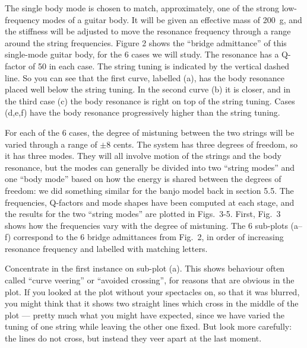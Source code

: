   The single body mode is chosen to match, approximately, one of the strong 
  low-frequency modes of a guitar body. It will be given an effective mass of 
  200~g, and the stiffness will be adjusted to move the resonance frequency 
  through a range around the string frequencies. Figure 2 shows the “bridge 
  admittance” of this single-mode guitar body, for the 6 cases we will study. 
  The resonance has a Q-factor of 50 in each case. The string tuning is 
  indicated by the vertical dashed line. So you can see that the first curve, 
  labelled (a), has the body resonance placed well below the string tuning. In 
  the second curve (b) it is closer, and in the third case (c) the body 
  resonance is right on top of the string tuning. Cases (d,e,f) have the body 
  resonance progressively higher than the string tuning. 


  For each of the 6 cases, the degree of mistuning between the two strings will 
  be varied through a range of $\pm8$ cents. The system has three degrees of 
  freedom, so it has three modes. They will all involve motion of the strings 
  and the body resonance, but the modes can generally be divided into two 
  ``string modes'' and one ``body mode'' based on how the energy is shared 
  between the degrees of freedom: we did something similar for the banjo model 
  back in section 5.5. The frequencies, Q-factors and mode shapes have been 
  computed at each stage, and the results for the two ``string modes'' are 
  plotted in Figs.\ 3-5. First, Fig.\ 3 shows how the frequencies vary with the 
  degree of mistuning. The 6 sub-plots (a--f) correspond to the 6 bridge 
  admittances from Fig.\ 2, in order of increasing resonance frequency and 
  labelled with matching letters. 


  Concentrate in the first instance on sub-plot (a). This shows behaviour often 
  called ``curve veering'' or ``avoided crossing'', for reasons that are 
  obvious in the plot. If you looked at the plot without your spectacles on, so 
  that it was blurred, you might think that it shows two straight lines which 
  cross in the middle of the plot --- pretty much what you might have expected, 
  since we have varied the tuning of one string while leaving the other one 
  fixed. But look more carefully: the lines do not cross, but instead they veer 
  apart at the last moment. 

